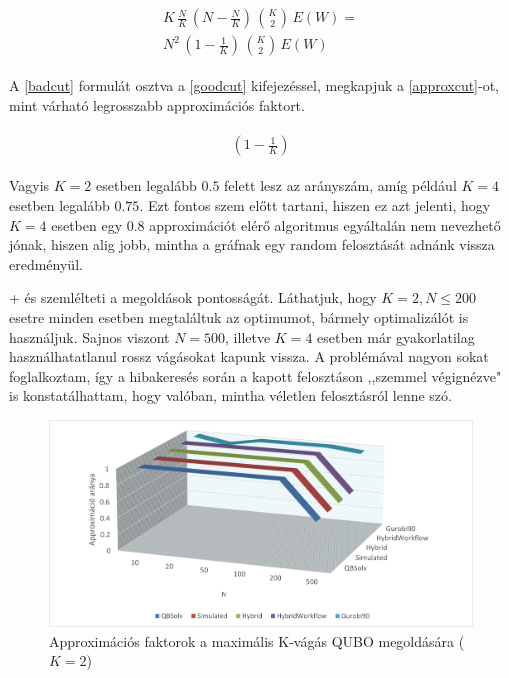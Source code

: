 \begin{align}
	\begin{split}
		K \, \frac{N}{K} \, \left( N-\frac{N}{K} \right) \, \binom{K}{2} \, E(W) = \label{badcut} \\
		 N^2 \, \left( 1 -\frac{1}{K} \right) \,\binom{K}{2} \, E(W)
	\end{split}
\end{align}

A \ref{badcut} formulát osztva a \ref{goodcut} kifejezéssel, megkapjuk a \ref{approxcut}-ot, mint várható legrosszabb approximációs faktort.

\begin{align}
	\begin{split}
		\left( 1 -\frac{1}{K} \right) \label{approxcut}
	\end{split}
\end{align}

Vagyis $K=2$ esetben legalább $0.5$ felett lesz az arányszám, amíg például $K=4$ esetben legalább $0.75$. Ezt fontos szem előtt tartani, hiszen ez azt jelenti, hogy $K=4$ esetben egy $0.8$ approximációt elérő algoritmus egyáltalán nem nevezhető jónak, hiszen alig jobb, mintha a gráfnak egy random felosztását adnánk vissza eredményül.

\Az+ és  szemlélteti a megoldások pontosságát. Láthatjuk, hogy $K=2, N \leq 200$ esetre minden esetben megtaláltuk az optimumot, bármely optimalizálót is használjuk. Sajnos viszont $N=500$, illetve $K=4$ esetben már gyakorlatilag használhatatlanul rossz vágásokat kapunk vissza. A problémával nagyon sokat foglalkoztam, így a hibakeresés során a kapott felosztáson ,,szemmel végignézve" is konstatálhattam, hogy valóban, mintha véletlen felosztásról lenne szó.

\begin{figure}[!ht]
	\centering
	\includegraphics[width=150mm, keepaspectratio]{figures/diagrams/maxKCutQUBO_K2approx.png}
	\caption{Approximációs faktorok a maximális K-vágás QUBO megoldására ($K=2$)}
	\label{fig:maxKCutQUBO_K2approx}
\end{figure}

